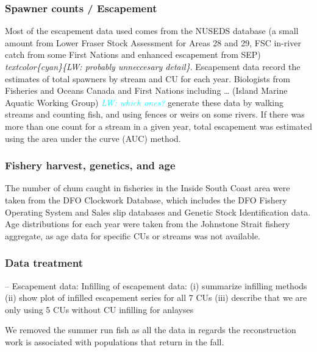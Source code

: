 \documentclass[11pt]{book}
\begin{document}
\hypertarget{spawner-counts-escapement}{%
\subsubsection{Spawner counts / Escapement}\label{spawner-counts-escapement}}

Most of the escapement data used comes from the NUSEDS database (a small amount from Lower Fraser Stock Assessment for Areas 28 and 29, FSC in-river catch from some First Nations and enhanced escapement from SEP) \emph{textcolor\{cyan\}\{LW: probably unneccesary detail\}}. Escapement data record the estimates of total spawners by stream and CU for each year. Biologists from Fisheries and Oceans Canada and First Nations including \ldots{} (Island Marine Aquatic Working Group) \emph{\textcolor{cyan}{LW: which ones?}} generate these data by walking streams and counting fish, and using fences or weirs on some rivers. If there was more than one count for a stream in a given year, total escapement was estimated using the area under the curve (AUC) method.

\hypertarget{fishery-harvest-genetics-and-age}{%
\subsubsection{Fishery harvest, genetics, and age}\label{fishery-harvest-genetics-and-age}}

The number of chum caught in fisheries in the Inside South Coast area were taken from the DFO Clockwork Database, which includes the DFO Fishery Operating System and Sales slip databases and Genetic Stock Identification data. Age distributions for each year were taken from the Johnstone Strait fishery aggregate, as age data for specific CUs or streams was not available.

\hypertarget{data-treatment}{%
\subsubsection{Data treatment}\label{data-treatment}}

-- Escapement data: Infilling of escapement data: (i) summarize infilling methods (ii) show plot of infilled escapement series for all 7 CUs (iii) describe that we are only using 5 CUs without CU infilling for anlayses

We removed the summer run fish as all the data in regards the reconstruction work is associated with populations that return in the fall.
\end{document}
